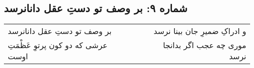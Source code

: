 \begin{center}
\section*{شماره ۹: بر وصف تو دستِ عقل دانانرسد}
\label{sec:009}
\begin{longtable}{l p{0.5cm} r}
بر وصف تو دستِ عقل دانانرسد
&&
و ادراکِ ضمیرِ جان بینا نرسد
\\
عرشی که دو کون پرتوِ عَظْمَتِ اوست
&&
موری چه عجب اگر بدانجا نرسد
\\
\end{longtable}
\end{center}

